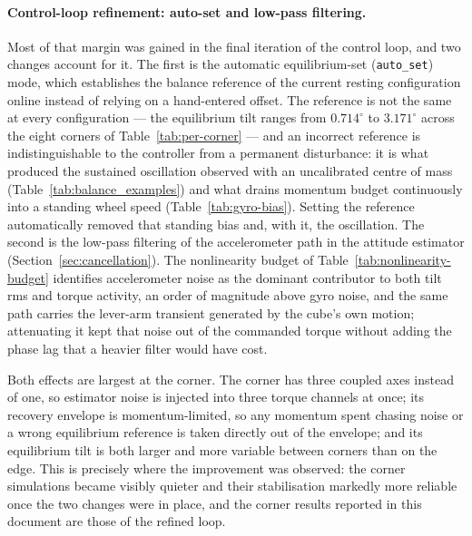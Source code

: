 \paragraph{Control-loop refinement: auto-set and low-pass filtering.} Most of that margin was gained in the final iteration of the control loop, and two changes account for it. The first is the automatic equilibrium-set (\texttt{auto\_set}) mode, which establishes the balance reference of the current resting configuration online instead of relying on a hand-entered offset. The reference is not the same at every configuration --- the equilibrium tilt ranges from $0.714^\circ$ to $3.171^\circ$ across the eight corners of Table~\ref{tab:per-corner} --- and an incorrect reference is indistinguishable to the controller from a permanent disturbance: it is what produced the sustained oscillation observed with an uncalibrated centre of mass (Table~\ref{tab:balance_examples}) and what drains momentum budget continuously into a standing wheel speed (Table~\ref{tab:gyro-bias}). Setting the reference automatically removed that standing bias and, with it, the oscillation. The second is the low-pass filtering of the accelerometer path in the attitude estimator (Section~\ref{sec:cancellation}). The nonlinearity budget of Table~\ref{tab:nonlinearity-budget} identifies accelerometer noise as the dominant contributor to both tilt rms and torque activity, an order of magnitude above gyro noise, and the same path carries the lever-arm transient generated by the cube's own motion; attenuating it kept that noise out of the commanded torque without adding the phase lag that a heavier filter would have cost.

Both effects are largest at the corner. The corner has three coupled axes instead of one, so estimator noise is injected into three torque channels at once; its recovery envelope is momentum-limited, so any momentum spent chasing noise or a wrong equilibrium reference is taken directly out of the envelope; and its equilibrium tilt is both larger and more variable between corners than on the edge. This is precisely where the improvement was observed: the corner simulations became visibly quieter and their stabilisation markedly more reliable once the two changes were in place, and the corner results reported in this document are those of the refined loop.


